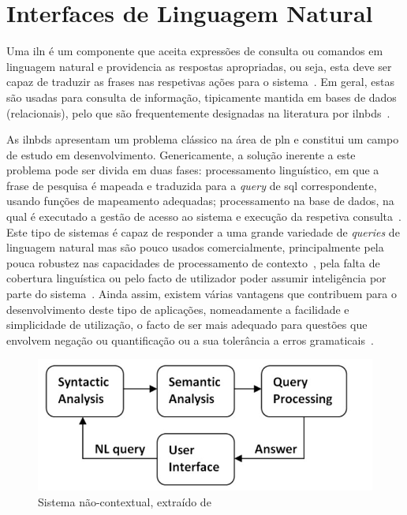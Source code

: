 \section{Interfaces de Linguagem Natural}
\label{sec:chap03_nli}
Uma \gls{iln} é um componente que aceita expressões de consulta ou comandos em linguagem natural e providencia as respostas apropriadas, ou seja, esta deve ser capaz de traduzir as frases nas respetivas ações para o sistema~\parencite{nlp}. Em geral, estas são usadas para consulta de informação, tipicamente mantida em bases de dados (relacionais), pelo que são frequentemente designadas na literatura por \glspl{ilnbd}~\parencite{overview_nlidb_approaches_implementation_airline, novel_approach_building_generic_portable_contextual_nlidb_system}.

As \glspl{ilnbd} apresentam um problema clássico na área de \gls{pln} e constitui um campo de estudo em desenvolvimento. Genericamente, a solução inerente a este problema pode ser divida em duas fases: processamento linguístico, em que a frase de pesquisa é mapeada e traduzida para a \textit{query} de \gls{sql} correspondente, usando funções de mapeamento adequadas; processamento na base de dados, na qual é executado a gestão de acesso ao sistema e execução da respetiva consulta~\parencite{overview_nlidb_approaches_implementation_airline}. Este tipo de sistemas é capaz de responder a uma grande variedade de \textit{queries} de linguagem natural mas são pouco usados comercialmente, principalmente pela pouca robustez nas capacidades de processamento de contexto~\parencite{novel_approach_towards_incorporating_context_processing_nlidb}, pela falta de cobertura linguística ou pelo facto de utilizador poder assumir inteligência por parte do sistema~\parencite{survey_nlidb, overview_nlidb_approaches_implementation_airline}. Ainda assim, existem várias vantagens que contribuem para o desenvolvimento deste tipo de aplicações, nomeadamente a facilidade e simplicidade de utilização, o facto de ser mais adequado para questões que envolvem negação ou quantificação ou a sua tolerância a erros gramaticais~\parencite{survey_nlidb, nlidb_brief_review, overview_nlidb_approaches_implementation_airline}.
%
\begin{figure}[!h]
    \centering
    \includegraphics[width=.7\textwidth]{ch03/assets/non_contextual_nlidb.jpg}
    \caption{Sistema não-contextual, extraído de~\textcite{novel_approach_towards_incorporating_context_processing_nlidb}}
    \label{fig:noncontextual_nlidb}
\end{figure}

